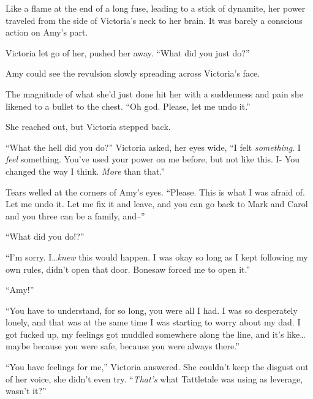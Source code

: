 Like a flame at the end of a long fuse, leading to a stick of dynamite, her power traveled from the side of Victoria's neck to her brain.  It was barely a conscious action on Amy's part.



Victoria let go of her, pushed her away.  ``What did you just do?''



Amy could see the revulsion slowly spreading across Victoria's face.



The magnitude of what she'd just done hit her with a suddenness and pain she likened to a bullet to the chest.  ``Oh god.  Please, let me undo it.''



She reached out, but Victoria stepped back.



``What the hell did you do?'' Victoria asked, her eyes wide, ``I felt \emph{something}.  I \emph{feel} something.  You've used your power on me before, but not like this.  I- You changed the way I think.  \emph{More} than that.''



Tears welled at the corners of Amy's eyes.  ``Please.  This is what I was afraid of.  Let me undo it.  Let me fix it and leave, and you can go back to Mark and Carol and you three can be a family, and--''



``What did you do!?''



``I'm sorry.  I\ldots \emph{knew} this would happen.  I was okay so long as I kept following my own rules, didn't open that door.  Bonesaw forced me to open it.''



``Amy!''



``You have to understand, for so long, you were all I had.  I was so desperately lonely, and that was at the same time I was starting to worry about my dad.  I got fucked up, my feelings got muddled somewhere along the line, and it's like\ldots maybe because you were safe, because you were always there.''



``You have feelings for me,'' Victoria answered.  She couldn't keep the disgust out of her voice, she didn't even try.  ``\emph{That's} what Tattletale was using as leverage, wasn't it?''



